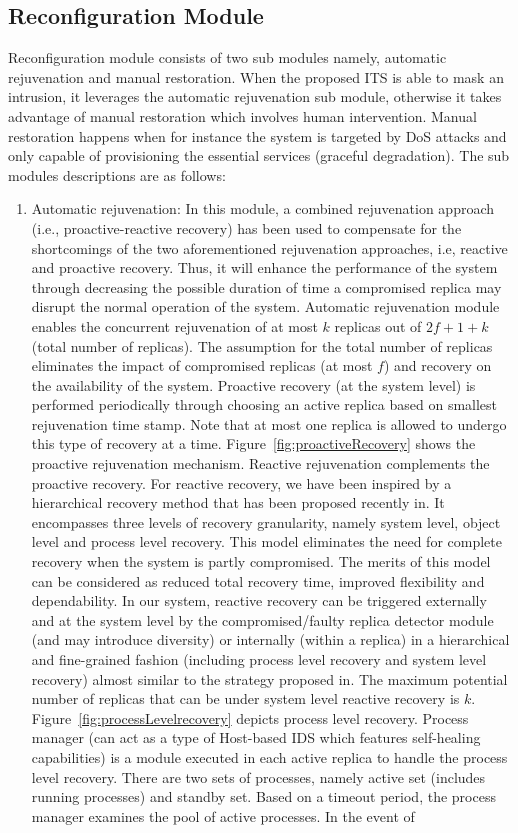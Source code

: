 \documentclass[preprint,number,12pt]{elsarticle}
\begin{document}
\subsection{Reconfiguration Module}
Reconfiguration module consists of two sub modules namely, automatic rejuvenation and manual restoration. When the proposed ITS is able to mask an intrusion, it leverages the automatic rejuvenation sub module, otherwise it takes advantage of manual restoration which involves human intervention.
Manual restoration happens when for instance the system is targeted by DoS attacks and only capable of provisioning the essential services
(graceful degradation). The sub modules descriptions are as follows:
\begin {enumerate}
\item Automatic rejuvenation: In this module, a combined rejuvenation approach (i.e., proactive-reactive recovery) has been used to compensate for the shortcomings of the two aforementioned rejuvenation approaches, i.e, reactive and proactive recovery. Thus, it will enhance the performance of the system through decreasing the possible duration of time a compromised replica may disrupt the normal operation of the system\citep{Sousa2010}. Automatic rejuvenation module enables the concurrent rejuvenation of at most $k$ replicas out of $2f+1+k$ (total number of replicas). The assumption for the total number of replicas eliminates the impact of compromised replicas (at most $f$) and recovery on the availability of the system. Proactive recovery (at the system level) is performed periodically through choosing an active replica based on smallest rejuvenation time stamp. Note that at most one replica is allowed to undergo this type of recovery at a time. Figure~\ref{fig:proactiveRecovery} shows the proactive rejuvenation mechanism. Reactive rejuvenation complements the proactive recovery. For reactive recovery, we have been inspired by a hierarchical recovery method that has been proposed recently in\citep{springerlink:10.1007/978-3-642-23971-7_36}. It encompasses three levels of recovery granularity, namely system level, object level and process level recovery. This model eliminates the need for complete recovery when the system is partly compromised. The merits of this model can be considered as reduced total recovery time, improved flexibility and dependability. In our system, reactive recovery can be triggered externally and at the system level by the compromised/faulty replica detector module (and may introduce diversity) or internally (within a replica) in a hierarchical and fine-grained fashion (including process level recovery and system level recovery) almost similar to the strategy proposed in\citep{springerlink:10.1007/978-3-642-23971-7_36}. The maximum potential number of replicas that can be under system level reactive recovery is $k$. Figure~\ref{fig:processLevelrecovery} depicts process level recovery. Process manager (can act as a type of Host-based IDS which features self-healing capabilities) is a module executed in each active replica to handle the process level recovery. There are two sets of processes, namely active set (includes running processes) and standby set. Based on a timeout period, the process manager examines the pool of active processes.  In the event of 
\end{enumerate}
\end{document}
